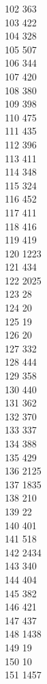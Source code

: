 { 102	363 \\
 103	422 \\
 104	328 \\
 105	507 \\
 106	344 \\
 107	420 \\
 108	380 \\
 109	398 \\
 110	475 \\
 111	435 \\
 112	396 \\
 113	411 \\
 114	348 \\
 115	324 \\
 116	452 \\
 117	411 \\
 118	416 \\
 119	419 \\
 120	1223 \\
 121	434 \\
 122	2025 \\
 123	28 \\
 124	20 \\
 125	19 \\
 126	20 \\
 127	332 \\
 128	444 \\
 129	358 \\
 130	440 \\
 131	362 \\
 132	370 \\
 133	337 \\
 134	388 \\
 135	429 \\
 136	2125 \\
 137	1835 \\
 138	210 \\
 139	22 \\
 140	401 \\
 141	518 \\
 142	2434 \\
 143	340 \\
 144	404 \\
 145	382 \\
 146	421 \\
 147	437 \\
 148	1438 \\
 149	19 \\
 150	10 \\
 151	1457 \\
}
